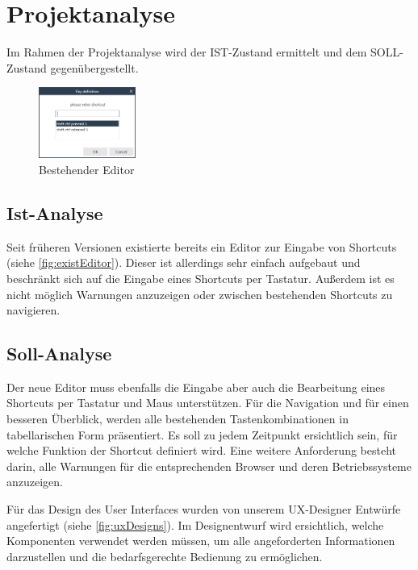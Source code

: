 \section{Projektanalyse}

Im Rahmen der Projektanalyse wird der IST-Zustand ermittelt und dem SOLL-Zustand gegenübergestellt.

\begin{figure}
	\vspace{-40px}
	\centering
	\includegraphics[width=120px]{../img/Alter-Editor.PNG}
	\caption{Bestehender Editor}
	\label{fig:existEditor}
\end{figure}

\subsection{Ist-Analyse}

Seit früheren Versionen existierte bereits ein Editor zur Eingabe von Shortcuts (siehe \autoref{fig:existEditor}). Dieser ist allerdings sehr einfach aufgebaut und beschränkt sich auf die Eingabe eines Shortcuts per Tastatur. Außerdem ist es nicht möglich Warnungen anzuzeigen oder zwischen bestehenden Shortcuts zu navigieren.

\subsection{Soll-Analyse}

Der neue Editor muss ebenfalls die Eingabe aber auch die Bearbeitung eines Shortcuts per Tastatur und Maus unterstützen. Für die Navigation und für einen besseren Überblick, werden alle bestehenden Tastenkombinationen in tabellarischen Form präsentiert. Es soll zu jedem Zeitpunkt ersichtlich sein, für welche Funktion der Shortcut definiert wird. Eine weitere Anforderung besteht darin, alle Warnungen für die entsprechenden Browser und deren Betriebssysteme anzuzeigen.

Für das Design des User Interfaces wurden von unserem UX-Designer Entwürfe angefertigt (siehe \autoref{fig:uxDesigns}). Im Designentwurf wird ersichtlich, welche Komponenten verwendet werden müssen, um alle angeforderten Informationen darzustellen und die bedarfsgerechte Bedienung zu ermöglichen.



